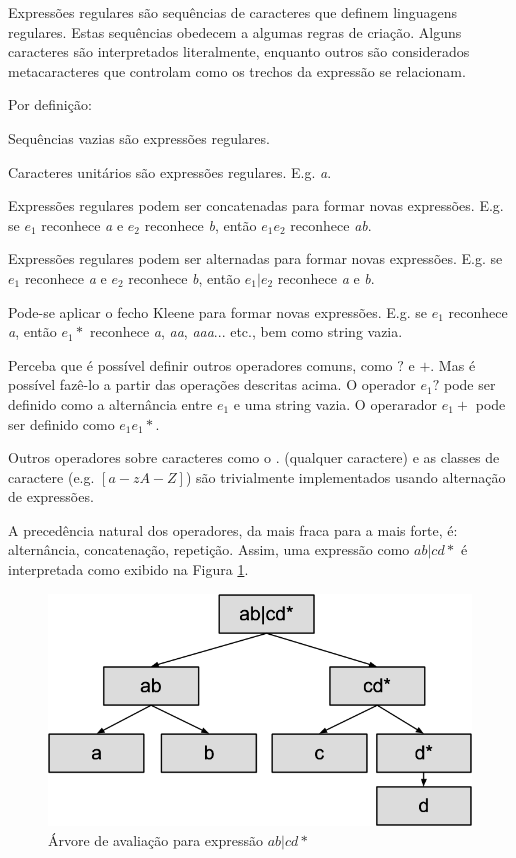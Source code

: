 \documentclass[a4paper,12pt,oneside,onecolumn]{uerj}
\begin{document}
Expressões regulares são sequências de caracteres que definem linguagens regulares. Estas sequências obedecem a algumas regras de criação. Alguns caracteres são interpretados literalmente, enquanto outros são considerados metacaracteres que controlam como os trechos da expressão se relacionam.

Por definição:

\begin{lcircp}
    \item Sequências vazias são expressões regulares.
    \item Caracteres unitários são expressões regulares. E.g. \emph{a}.
    \item Expressões regulares podem ser concatenadas para formar novas expressões. E.g. se $e_1$ reconhece \emph{a} e $e_2$ reconhece \emph{b}, então $e_1e_2$ reconhece \emph{ab}.
    \item Expressões regulares podem ser alternadas para formar novas expressões. E.g. se $e_1$ reconhece \emph{a} e $e_2$ reconhece \emph{b}, então $e_1|e_2$ reconhece \emph{a} e \emph{b}.
    \item Pode-se aplicar o fecho Kleene para formar novas expressões. E.g. se $e_1$ reconhece \emph{a}, então $e_1*$ reconhece \emph{a}, \emph{aa}, \emph{aaa}... etc., bem como string vazia.
\end{lcircp}

Perceba que é possível definir outros operadores comuns, como $?$ e $+$. Mas é possível fazê-lo a partir das operações descritas acima. O operador $e_1?$ pode ser definido como a alternância entre $e_1$ e uma string vazia. O operarador $e_1+$ pode ser definido como $e_1e_1*$.

Outros operadores sobre caracteres como o $.$ (qualquer caractere) e as classes de caractere (e.g. $[a-zA-Z]$) são trivialmente implementados usando alternação de expressões.

A precedência natural dos operadores, da mais fraca para a mais forte, é: alternância, concatenação, repetição. Assim, uma expressão como $ab|cd*$ é interpretada como exibido na Figura \ref{fig:abcd_parse_tree}.

\begin{figure}[ht]
  \centering
  \includegraphics[scale=0.4]{figures/abcd_parse_tree.png}
  \caption{Árvore de avaliação para expressão $ab|cd*$}
  \label{fig:abcd_parse_tree}
\end{figure}
\end{document}
